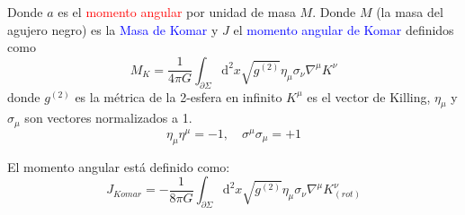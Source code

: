 \documentclass[../main]{subfiles}
\begin{document}
Donde $a$ es el \textcolor{red}{momento angular} por unidad de masa $M$. Donde $M$ (la masa del agujero negro) es la \textcolor{blue}{Masa de Komar} y $J$ el \textcolor{blue}{momento angular de Komar} definidos como 
\begin{equation}
    M_K=\dfrac{1}{4\pi G}\int_{\partial \Sigma}\mathrm{d}^2 x \sqrt{g^{(2)}} \eta_{\mu} \sigma_{\nu} \nabla^{\mu}K^{\nu}
\end{equation}
donde $g^{(2)}$ es la métrica de la 2-esfera en infinito $K^{\mu}$ es el vector de Killing, $\eta_{\mu}$ y $\sigma_{\mu}$ son vectores normalizados a 1.
\begin{equation}
    \eta_{\mu}\eta^{\mu}=-1,\quad \sigma^{\mu}\sigma_{\mu}=+1
\end{equation}

El momento angular está definido como:
\begin{equation}
    J_{Komar}=-\dfrac{1}{8\pi G}\int_{\partial \Sigma} \mathrm{d}^2 x \sqrt{g^{(2)}} \eta_{\mu} \sigma_{\nu} \nabla^{\mu} K^{\nu}_{(rot)}
\end{equation}
\end{document}
